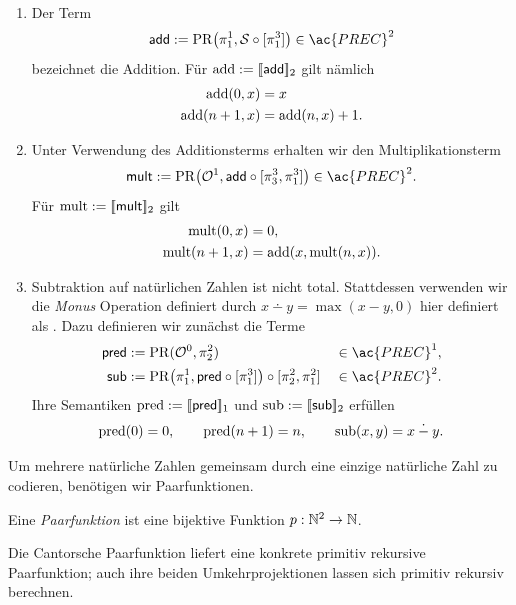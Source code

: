 \begin{Bsp*}\
  \begin{enumerate}
  \item Der Term
    \[
      \mathsf{add}
      :=\PR\bigl(\pi_1^1,\mathcal{S}\circ[\pi_1^3]\bigr)
      \in\ac{PREC}^2
    \]
    bezeichnet die Addition. Für
    $\operatorname{add}:=[\![\mathsf{add}]\!]_2$ gilt nämlich
    \begin{align*}
      \operatorname{add}(0,x) &=x\\
      \operatorname{add}(n+1,x) &= \operatorname{add}(n,x)+1.
    \end{align*}
  \item Unter Verwendung des Additionsterms erhalten wir den
    Multiplikationsterm
    \[
      \mathsf{mult}
      :=\PR\bigl(\mathcal{O}^1,
        \mathsf{add}\circ[\pi_3^3,\pi_1^3]\bigr)
      \in\ac{PREC}^2.
    \]
    Für $\operatorname{mult}:=[\![\mathsf{mult}]\!]_2$ gilt
    \begin{align*}
      \operatorname{mult}(0,x) &=0,\\
      \operatorname{mult}(n+1,x) &= \operatorname{add}(x,\operatorname{mult}(n,x)).
    \end{align*}
  \item{}
    Subtraktion auf natürlichen Zahlen ist
    nicht total. Stattdessen verwenden wir die \emph{Monus} Operation
    definiert durch $x \dotminus y = \max (x-y, 0)$ hier definiert als
    \sub. Dazu definieren wir zunächst die Terme
    \begin{align*}
      \mathsf{pred}
        &:=\PR(\mathcal{O}^0,\pi_2^2)
        &&\in\ac{PREC}^1,\\
      \mathsf{sub}
        &:=\PR\bigl(\pi_1^1,\mathsf{pred}\circ[\pi_1^3]\bigr)
          \circ[\pi_2^2,\pi_1^2]
        &&\in\ac{PREC}^2.
    \end{align*}
    Ihre Semantiken $\textrm{pred}:=[\![\mathsf{pred}]\!]_1$ und
    $\textrm{sub}:=[\![\mathsf{sub}]\!]_2$ erfüllen
    \[
      \textrm{pred}(0)=0,\qquad \textrm{pred}(n+1)=n,\qquad
      \textrm{sub}(x,y)=x\mathbin{\dot{-}} y.
    \]
  \end{enumerate}
\end{Bsp*}
Um mehrere natürliche Zahlen gemeinsam durch eine einzige natürliche Zahl zu
codieren, benötigen wir Paarfunktionen.
\begin{Def}
  Eine \emph{Paarfunktion} ist eine bijektive Funktion $p : \mathbb{N}^2 \to \mathbb{N}$.
\end{Def}
Die Cantorsche Paarfunktion liefert eine konkrete primitiv rekursive
Paarfunktion; auch ihre beiden Umkehrprojektionen lassen sich primitiv rekursiv
berechnen.
